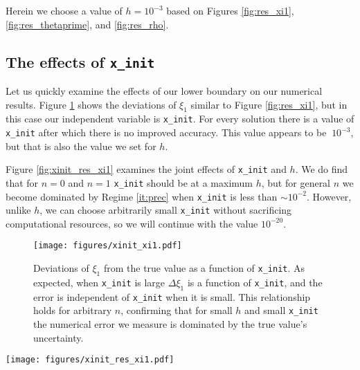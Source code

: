 \documentclass[twocolumn]{aastex631}
\begin{document}
Herein we choose a value of $h = 10^{-3}$ based on Figures \ref{fig:res_xi1},
\ref{fig:res_thetaprime}, and \ref{fig:res_rho}.

\subsection{The effects of \texttt{x\_init}}
\label{subsec:init}
Let us quickly examine the effects of our lower boundary on our
numerical results. Figure \ref{fig:xinit_xi1} shows the
deviations of $\xi_1$ similar to Figure \ref{fig:res_xi1},
but in this case our independent variable is \texttt{x\_init}.
For every solution there is a value of \texttt{x\_init}
after which there is no improved accuracy. This value appears to be
$~10^{-3}$, but that is also the value we set for $h$.

Figure \ref{fig:xinit_res_xi1} examines the joint effects of 
\texttt{x\_init} and $h$. We do find that for $n=0$ and $n=1$
\texttt{x\_init} should be at a maximum $h$, but for general $n$
we become dominated by Regime \ref{it:prec} when \texttt{x\_init}
is less than $\sim 10^{-2}$. However, unlike $h$, we can choose arbitrarily
small \texttt{x\_init} without sacrificing computational
resources, so we will continue with the value $10^{-20}$.

\begin{figure}[h]
    \begin{centering}
        \texttt{[image: figures/xinit\_xi1.pdf]}
        \caption{Deviations of $\xi_1$ from the true value as a
        function of \texttt{x\_init}. As expected, when \texttt{x\_init}
        is large $\Delta \xi_1$ is a function of \texttt{x\_init},
        and the error is independent of \texttt{x\_init} when it is small.
        This relationship holds for arbitrary $n$, confirming that
        for small $h$ and small \texttt{x\_init} the numerical
        error we measure is dominated by the true value's uncertainty.}
        \label{fig:xinit_xi1}
    \end{centering}
\end{figure}

\begin{figure*}[h]
    \begin{centering}
        \texttt{[image: figures/xinit\_res\_xi1.pdf]}
        \caption{Deviations of $\xi_1$ from the true value as a function
        of both \texttt{x\_init} and $h$. The dashed line
        marks the curve \texttt{x\_init}$=h$.}
        \label{fig:xinit_res_xi1}
    \end{centering}
\end{figure*}
\end{document}
